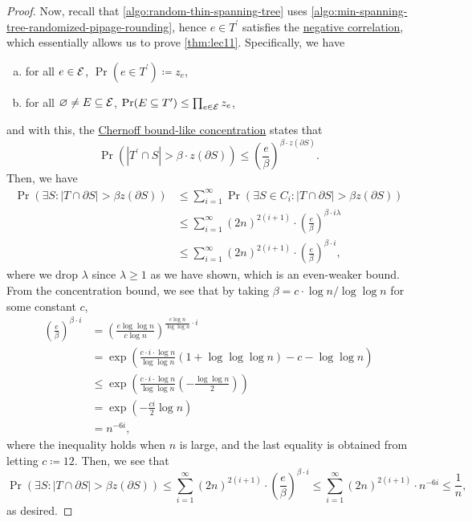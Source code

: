 \begin{proof}
	Now, recall that \autoref{algo:random-thin-spanning-tree} uses \autoref{algo:min-spanning-tree-randomized-pipage-rounding}, hence \(e\in T^\prime \) satisfies the \hyperref[thm:negative-correlation]{negative correlation}, which essentially allows us to prove \autoref{thm:lec11}. Specifically, we have
	\begin{enumerate}[(a)]
		\item for all \(e\in \mathcal{\MakeUppercase{e}} \), \(\Pr(e\in T^\prime ) \coloneqq z_e\),
		\item for all \(\varnothing \neq E \subseteq \mathcal{\MakeUppercase{e}} \), \(\Pr(E \subseteq T^\prime) \leq \prod_{e\in \mathcal{\MakeUppercase{e}} } z_e\),
	\end{enumerate}
	and with this, the \hyperref[thm:lec11]{Chernoff bound-like concentration} states that
	\[
		\Pr(\left\vert T^\prime \cap S \right\vert > \beta \cdot z(\partial S)) \leq \left( \frac{e}{\beta } \right) ^{\beta \cdot z(\partial S)}.
	\]
	Then, we have
	\[
		\begin{split}
			\Pr(\exists S\colon \left\vert T \cap \partial S \right\vert > \beta z(\partial S))
			&\leq \sum_{i=1} ^{\infty} \Pr(\exists S\in C_i \colon \left\vert T \cap \partial S \right\vert > \beta z(\partial S))\\
			&\leq \sum_{i=1}^{\infty} (2n)^{2(i+1)} \cdot \left( \frac{e}{\beta } \right) ^{\beta \cdot i\lambda}\\
			&\leq \sum_{i=1}^{\infty} (2n)^{2(i+1)} \cdot \left( \frac{e}{\beta } \right) ^{\beta \cdot i},
		\end{split}
	\]
	where we drop \(\lambda\) since \(\lambda \geq 1\) as we have shown, which is an even-weaker bound. From the concentration bound, we see that by taking \(\beta = c\cdot \log n / \log \log n\) for some constant \(c\),
	\[
		\begin{split}
			\left( \frac{e}{\beta } \right) ^{\beta \cdot i}
			&= \left( \frac{e \log \log n}{c \log n} \right) ^{\frac{c\log n}{\log \log n}\cdot i}\\
			&= \exp \left( \frac{c\cdot i\cdot \log n}{\log \log n}(1 + \log \log \log n) - c - \log \log n \right) \\
			&\leq \exp \left( \frac{c\cdot i\cdot \log n}{\log \log n} \left( - \frac{\log \log n}{2} \right) \right) \\
			&= \exp \left( - \frac{ci}{2}\log n \right) \\
			&= n^{-6i},
		\end{split}
	\]
	where the inequality holds when \(n\) is large, and the last equality is obtained from letting \(c \coloneqq 12\). Then, we see that
	\[
		\Pr(\exists S\colon \left\vert T \cap \partial S \right\vert > \beta z(\partial S))
		\leq \sum_{i=1}^{\infty} (2n)^{2(i+1)} \cdot \left( \frac{e}{\beta } \right) ^{\beta \cdot i}
		\leq \sum_{i=1}^{\infty} (2n)^{2(i+1)} \cdot n^{-6i} \leq \frac{1}{n},
	\]
	as desired.
\end{proof}


